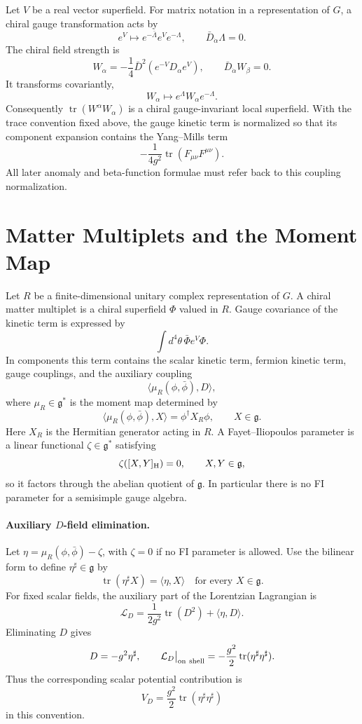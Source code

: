 Let \(V\) be a real vector superfield.  For matrix notation in a
representation of \(G\), a chiral gauge transformation acts by
\[
  e^V\longmapsto e^{-\bar\Lambda}e^V e^{-\Lambda},
  \qquad \bar D_{\dot\alpha}\Lambda=0 .
\]
The chiral field strength is
\[
  W_\alpha
  =
  -\frac14\bar D^2\!\left(e^{-V}D_\alpha e^V\right),
  \qquad
  \bar D_{\dot\alpha}W_\beta=0.
\]
It transforms covariantly,
\[
  W_\alpha\longmapsto e^\Lambda W_\alpha e^{-\Lambda}.
\]
Consequently \(\operatorname{tr}(W^\alpha W_\alpha)\) is a chiral
gauge-invariant local superfield.  With the trace convention fixed above, the
gauge kinetic term is normalized so that its component expansion contains the
Yang--Mills term
\[
  -\frac{1}{4g^2}\operatorname{tr}(F_{\mu\nu}F^{\mu\nu}).
\]
All later anomaly and beta-function formulae must refer back to this coupling
normalization.

\section{Matter Multiplets and the Moment Map}

Let \(R\) be a finite-dimensional unitary complex representation of \(G\).
A chiral matter multiplet is a chiral superfield \(\Phi\) valued in \(R\).
Gauge covariance of the kinetic term is expressed by
\[
  \int d^4\theta\, \bar\Phi e^V\Phi .
\]
In components this term contains the scalar kinetic term, fermion kinetic
term, gauge couplings, and the auxiliary coupling
\[
  \langle\mu_R(\phi,\bar\phi),D\rangle,
\]
where \(\mu_R\in\mathfrak g^*\) is the moment map determined by
\[
  \langle \mu_R(\phi,\bar\phi),X\rangle
  =
  \phi^\dagger X_R\phi,
  \qquad X\in\mathfrak g .
\]
Here \(X_R\) is the Hermitian generator acting in \(R\).  A
Fayet--Iliopoulos parameter is a linear functional
\(\zeta\in\mathfrak g^*\) satisfying
\[
  \zeta([X,Y]_{\rm H})=0,\qquad X,Y\in\mathfrak g,
\]
so it factors through the abelian quotient of \(\mathfrak g\).  In
particular there is no FI parameter for a semisimple gauge algebra.

\paragraph{Auxiliary \(D\)-field elimination.}
Let \(\eta=\mu_R(\phi,\bar\phi)-\zeta\), with \(\zeta=0\) if no FI parameter
is allowed.  Use the bilinear form to define
\(\eta^\sharp\in\mathfrak g\) by
\[
  \operatorname{tr}(\eta^\sharp X)=\langle\eta,X\rangle
  \quad\text{for every }X\in\mathfrak g .
\]
For fixed scalar fields, the auxiliary part of the Lorentzian Lagrangian is
\[
  \mathcal L_D
  =
  \frac{1}{2g^2}\operatorname{tr}(D^2)
  +\langle\eta,D\rangle .
\]
Eliminating \(D\) gives
\[
  D=-g^2\eta^\sharp,
  \qquad
  \mathcal L_D\big|_{\rm on\ shell}
  =
  -\frac{g^2}{2}\operatorname{tr}(\eta^\sharp\eta^\sharp).
\]
Thus the corresponding scalar potential contribution is
\[
  V_D=\frac{g^2}{2}\operatorname{tr}(\eta^\sharp\eta^\sharp)
\]
in this convention.

